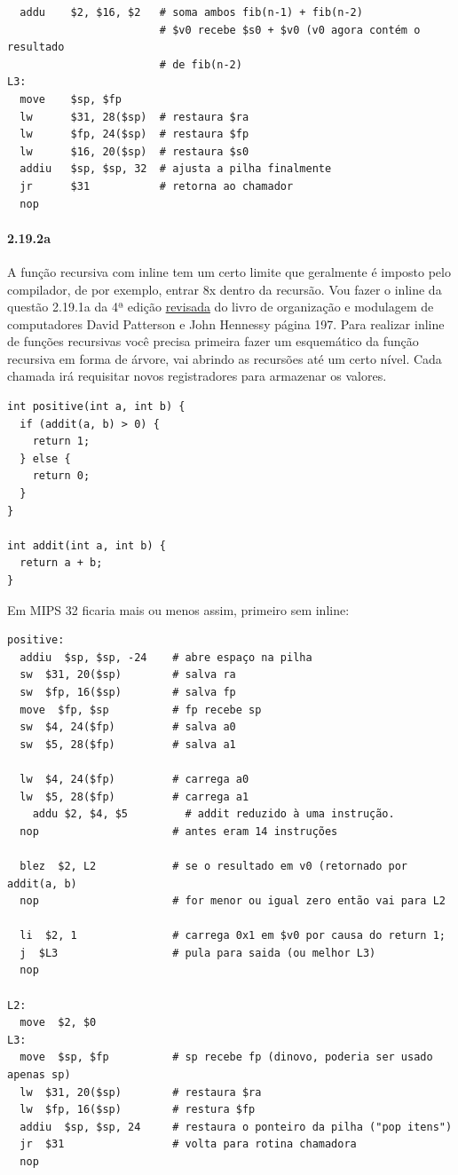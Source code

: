 \documentclass{article}
\begin{document}
\begin{verbatim}
  addu    $2, $16, $2   # soma ambos fib(n-1) + fib(n-2)
                        # $v0 recebe $s0 + $v0 (v0 agora contém o resultado
                        # de fib(n-2)
L3:
  move    $sp, $fp
  lw      $31, 28($sp)  # restaura $ra
  lw      $fp, 24($sp)  # restaura $fp
  lw      $16, 20($sp)  # restaura $s0
  addiu   $sp, $sp, 32  # ajusta a pilha finalmente
  jr      $31           # retorna ao chamador
  nop

\end{verbatim}

\paragraph{2.19.2a}

A função recursiva com inline tem um certo limite que geralmente é imposto pelo
compilador, de por exemplo, entrar 8x dentro da recursão. Vou fazer o inline da
questão 2.19.1a da 4ª edição \underline{revisada} do livro de organização e
modulagem de computadores David Patterson e John Hennessy página 197. Para
realizar inline de funções recursivas você precisa primeira fazer um
esquemático da função recursiva em forma de árvore, vai abrindo as recursões
até um certo nível. Cada chamada irá requisitar novos registradores para
armazenar os valores.

\begin{verbatim}
int positive(int a, int b) {
  if (addit(a, b) > 0) {
    return 1;
  } else {
    return 0;
  }
}

int addit(int a, int b) {
  return a + b;
}
\end{verbatim}

Em MIPS 32 ficaria mais ou menos assim, primeiro sem inline:

\begin{verbatim}
positive:
  addiu  $sp, $sp, -24    # abre espaço na pilha
  sw  $31, 20($sp)        # salva ra
  sw  $fp, 16($sp)        # salva fp
  move  $fp, $sp          # fp recebe sp
  sw  $4, 24($fp)         # salva a0
  sw  $5, 28($fp)         # salva a1

  lw  $4, 24($fp)         # carrega a0
  lw  $5, 28($fp)         # carrega a1
	addu $2, $4, $5         # addit reduzido à uma instrução.
  nop                     # antes eram 14 instruções

  blez  $2, L2            # se o resultado em v0 (retornado por addit(a, b)
  nop                     # for menor ou igual zero então vai para L2

  li  $2, 1               # carrega 0x1 em $v0 por causa do return 1;
  j  $L3                  # pula para saida (ou melhor L3)
  nop

L2:
  move  $2, $0
L3:
  move  $sp, $fp          # sp recebe fp (dinovo, poderia ser usado apenas sp)
  lw  $31, 20($sp)        # restaura $ra
  lw  $fp, 16($sp)        # restura $fp
  addiu  $sp, $sp, 24     # restaura o ponteiro da pilha ("pop itens")
  jr  $31                 # volta para rotina chamadora
  nop
\end{verbatim}
\end{document}
